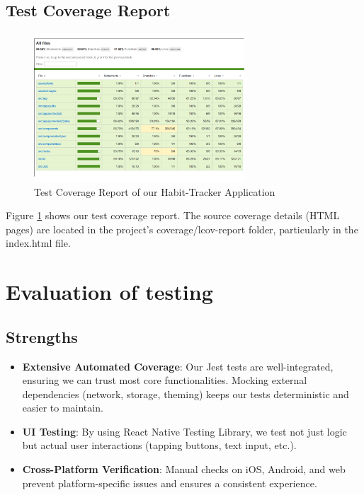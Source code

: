 \subsection{Test Coverage Report} \label{sect:test-coverage} 
\begin{figure}[H]
    \centering
    \includegraphics[width=0.7\textwidth]{resources/test_coverage.pdf}
    \caption{Test Coverage Report of our Habit-Tracker Application}
    \label{fig:test_coverage}
\end{figure}

Figure \ref{fig:test_coverage} shows our test coverage report. The source coverage details (HTML pages) are located in the project’s coverage/lcov-report folder, particularly in the index.html file. 


\section{Evaluation of testing} \label{sect:testing:evaluation}

\subsection{Strengths} \begin{itemize} \item \textbf{Extensive Automated Coverage}: Our Jest tests are well-integrated, ensuring we can trust most core functionalities. Mocking external dependencies (network, storage, theming) keeps our tests deterministic and easier to maintain. \item \textbf{UI Testing}: By using React Native Testing Library, we test not just logic but actual user interactions (tapping buttons, text input, etc.). \item \textbf{Cross-Platform Verification}: Manual checks on iOS, Android, and web prevent platform-specific issues and ensures a consistent experience. \end{itemize}


